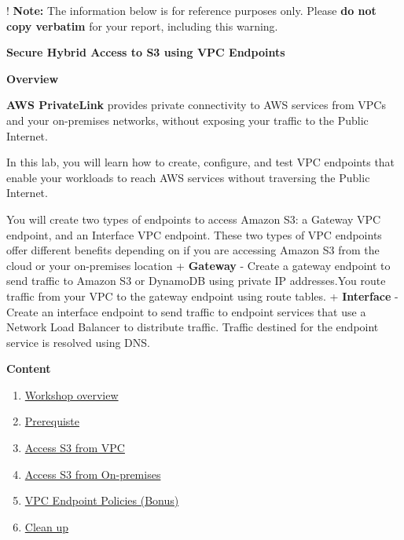! \textbf{Note:} The information below is for reference purposes only.
Please \textbf{do not copy verbatim} for your report, including this
warning.

\vspace{0.5em}\noindent\textbf{Secure Hybrid Access to S3 using VPC Endpoints}

\vspace{0.5em}\noindent\textbf{Overview}

\textbf{AWS PrivateLink} provides private connectivity to AWS services
from VPCs and your on-premises networks, without exposing your traffic
to the Public Internet.

In this lab, you will learn how to create, configure, and test VPC
endpoints that enable your workloads to reach AWS services without
traversing the Public Internet.

You will create two types of endpoints to access Amazon S3: a Gateway
VPC endpoint, and an Interface VPC endpoint. These two types of VPC
endpoints offer different benefits depending on if you are accessing
Amazon S3 from the cloud or your on-premises location + \textbf{Gateway}
- Create a gateway endpoint to send traffic to Amazon S3 or DynamoDB
using private IP addresses.You route traffic from your VPC to the
gateway endpoint using route tables. + \textbf{Interface} - Create an
interface endpoint to send traffic to endpoint services that use a
Network Load Balancer to distribute traffic. Traffic destined for the
endpoint service is resolved using DNS.

\vspace{0.5em}\noindent\textbf{Content}

\begin{enumerate}
\def\labelenumi{\arabic{enumi}.}
\tightlist
\item
  \href{5.1-Workshop-overview}{Workshop overview}
\item
  \href{5.2-Prerequiste/}{Prerequiste}
\item
  \href{5.3-S3-vpc/}{Access S3 from VPC}
\item
  \href{5.4-S3-onprem/}{Access S3 from On-premises}
\item
  \href{5.5-Policy/}{VPC Endpoint Policies (Bonus)}
\item
  \href{5.6-Cleanup/}{Clean up}
\end{enumerate}
